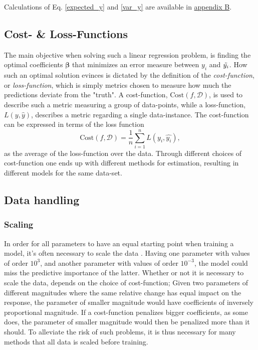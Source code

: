 Calculations of Eq. \ref{expected_y} and \ref{var_y} are available in \hyperref[appendixB]{appendix B}.

\subsection{Cost- \& Loss-Functions}
The main objective when solving such a linear regression problem, is finding the optimal coefficients $\boldsymbol{\beta}$ that minimizes an error measure between $y_i$ and $\Tilde{y_i}$. 
How such an optimal solution evinces is dictated by the definition of the \textit{cost-function},  or \textit{loss-function}, which is simply metrics chosen to measure how much the predictions deviate from the "truth". 
A cost-function, $\text{Cost}(f,\mathcal{D} )$, is used to describe such a metric measuring a group of data-points, while a loss-function, $L(y, \hat{y})$, describes a metric regarding a single data-instance. 
The cost-function can be expressed in terms of the loss function
\begin{equation}
\text{Cost}(f,\mathcal{D}) = \frac{1}{n}\sum_{i=1}^n L(y_i, \hat{y_i}),
\end{equation}
as the average of the loss-function over the data. 
Through different choices of cost-function one ends up with different methods for estimation, resulting in different models for the same data-set. 




\subsection{Data handling}

\subsubsection{Scaling}\label{scaling}

In order for all parameters to have an equal starting point when training a model, it's often necessary to scale the data \citep[p. 398]{hastie}. Having one parameter with values of order $10^3$, and another parameter with values of order $10^{-3}$, the model could miss the predictive importance of the latter. Whether or not it is necessary to scale the data, depends on the choice of cost-function; Given two parameters of different magnitudes where the same relative change has equal impact on the response, the parameter of smaller magnitude would have coefficients of inversely proportional magnitude. If a cost-function penalizes bigger coefficients, as some does, the parameter of smaller magnitude would then be penalized more than it should. To alleviate the risk of such problems, it is thus necessary for many methods that all data is scaled before training. 

